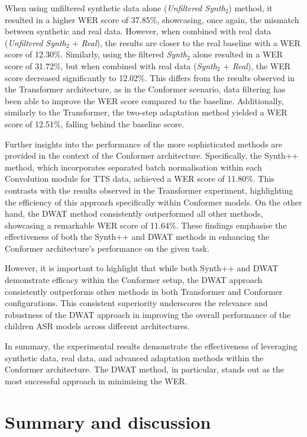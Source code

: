 When using unfiltered synthetic data alone (\textit{Unfiltered Synth$_2$}) method, it resulted in a higher \ac{WER} score of 37.85\%, showcasing, once again, the mismatch between synthetic and real data. However, when combined with real data (\textit{Unfiltered Synth$_2$} + \textit{Real}), the results are closer to the real baseline with a \ac{WER} score of 12.30\%. Similarly, using the filtered \textit{Synth$_2$} alone resulted in a \ac{WER} score of 31.72\%, but when combined with real data (\textit{Synth$_2$} + \textit{Real}), the \ac{WER} score decreased significantly to 12.02\%. This differs from the results observed in the Transformer architecture, as in the Conformer scenario, data filtering has been able to improve the \ac{WER} score compared to the baseline.
Additionally, similarly to the Transformer, the two-step adaptation method yielded a \ac{WER} score of 12.51\%, falling behind the baseline score. 

Further insights into the performance of the more sophisticated methods are provided in the context of the Conformer architecture. Specifically, the Synth++ method, which incorporates separated batch normalisation within each Convolution module for \ac{TTS} data, achieved a \ac{WER} score of 11.80\%. This contrasts with the results observed in the Transformer experiment, highlighting the efficiency of this approach specifically within Conformer models. On the other hand, the \ac{DWAT} method consistently outperformed all other methods, showcasing a remarkable \ac{WER} score of 11.64\%. These findings emphasise the effectiveness of both the Synth++ and \ac{DWAT} methods in enhancing the Conformer architecture's performance on the given task.

However, it is important to highlight that while both Synth++ and \ac{DWAT} demonstrate efficacy within the Conformer setup, the \ac{DWAT} approach consistently outperforms other methods in both Transformer and Conformer configurations. This consistent superiority underscores the relevance and robustness of the \ac{DWAT} approach in improving the overall performance of the children \ac{ASR} models across different architectures.

In summary, the experimental results demonstrate the effectiveness of leveraging synthetic data, real data, and advanced adaptation methods within the Conformer architecture. The \ac{DWAT} method, in particular, stands out as the most successful approach in minimising the \ac{WER}.


\section{Summary and discussion}
\label{section:conclusions_TTS}

